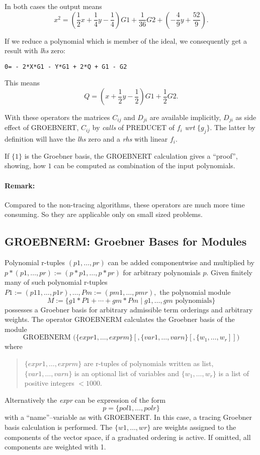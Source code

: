 In both cases the output means
\[
x^2 = (\frac{1}{2} x + \frac{1}{4} y - \frac{1}{4}) G1
 + \frac{1}{36} G2 + (-\frac{4}{9} y + \frac{52}{9}).
\]


\example {}

If we reduce a polynomial which is member of the ideal, we
consequently get a result with {\it lhs} zero:

\begin{verbatim}
0= - 2*X*G1 - Y*G1 + 2*Q + G1 - G2
\end{verbatim}

This means
\[ Q = ( x + \frac{1}{2} y - \frac{1}{2}) G1 + \frac{1}{2} G2.
\]

With these operators the matrices $C_{ij}$ and $D_{ji}$ are available
implicitly, $D_{ji}$ as side effect of GROEBNERT, $C_{ij}$ by {\it calls}
of PREDUCET of $f_i$ {\it wrt} $\{g_j\}$. The latter by definition will
have the {\it lhs} zero and a {\it rhs} with linear $f_i$.

If $\{1\}$ is the Groebner basis, the GROEBNERT calculation gives
a ``proof'', showing,  how  $1$ can be computed as combination of the
input polynomials.

\paragraph{Remark:} Compared to the non-tracing algorithms, these
operators are much more time consuming. So they are applicable
only on small sized problems.

\subsection{GROEBNERM: Groebner Bases for Modules}

Polynomial r-tuples
 $(p1,\ldots,pr) $ can be added componentwise
and multiplied by $ p*(p1,\ldots,pr) := (p*p1,\ldots,p*pr) $
for arbitrary polynomials $p.$  Given finitely many of
such polynomial r-tuples $P1:=(p11,\ldots,p1r),\ldots,Pm:=(pm1,\ldots,pmr),$
the polynomial module
\[ M := \{ g1*P1 + \cdots + gm*Pm \mid g1,\ldots,gm \mbox{ polynomials} \}
\]
possesses a Groebner basis for arbitrary admissible term orderings and
arbitrary weights. 
The operator GROEBNERM calculates the Groebner basis of the module
\[
\mbox{GROEBNERM } \bigl(\{expr1, \ldots , exprm\} [,\{var1, \ldots ,
varn\} [, \{w_1, \ldots , w_r] ] \bigr)
\]
where
\begin{quote}
$\{expr1, \ldots , exprm\}$  are r-tuples of polynomials written as list,
\linebreak[4]$\{var1, \ldots , varn\}$ is an optional list of variables and
$\{w_1, \ldots , w_r\}$ is a list of positive integers $<1000$.
\end{quote}
Alternatively the {\it expr} can be expression of the form
\[
p= \{pol1, \ldots , polr\}
\]
with a ``name''--variable as with GROEBNERT. In this case, a tracing
Groebner basis calculation is performed. The $\{w1, \ldots , wr\}$ are
weights assigned to the components of the vector space, if a graduated
ordering is active. If omitted, all components are weighted with 1.

